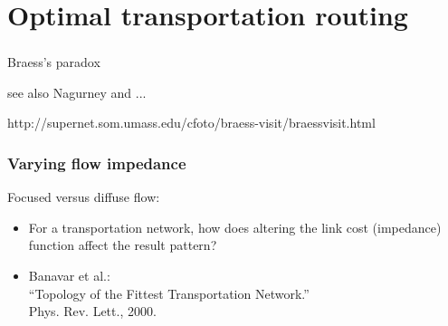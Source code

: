 \section{Optimal transportation routing}

\begin{frame}
  \frametitle{}


\end{frame}

Braess's paradox\cite{braess1968a,braess2005a,nagurney2005a}

see also Nagurney and ...

http://supernet.som.umass.edu/cfoto/braess-visit/braessvisit.html


\begin{frame}
  \frametitle{Varying flow impedance}

  \begin{block}{Focused versus diffuse flow:}
  \begin{itemize}
  \item<1->
    For a transportation network, how does
    altering the link cost (impedance) function
    affect the result pattern?
  \item<2->
    Banavar et al.\cite{banavar2000a}:\\
    ``Topology of the Fittest Transportation Network.''\\
    Phys. Rev. Lett., 2000.
  \end{itemize}
    
  \end{block}

  
\end{frame}
